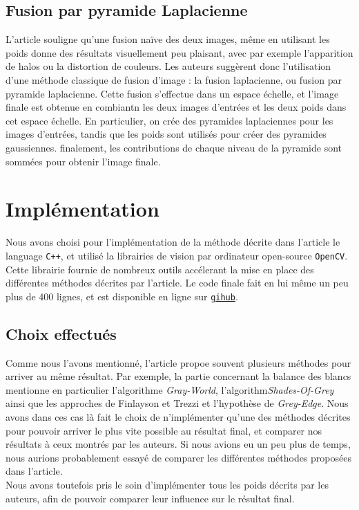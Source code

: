 \documentclass[twoside]{article}
\begin{document}
\subsection{Fusion par pyramide Laplacienne}
L'article souligne qu'une fusion naïve des deux images, même en utilisant les poids donne des résultats visuellement peu plaisant, avec par exemple l'apparition de halos ou la distortion de couleurs. Les auteurs suggèrent donc l'utilisation d'une méthode classique de fusion d'image : la fusion laplacienne, ou fusion par pyramide laplacienne. Cette fusion s'effectue dans un espace échelle, et l'image finale est obtenue en combiantn les deux images d'entrées et les deux poids dans cet espace échelle. En particulier, on crée des pyramides laplaciennes pour les images d'entrées, tandis que les poids sont utilisés pour créer des pyramides gaussiennes. finalement, les contributions de chaque niveau de la pyramide sont sommées pour obtenir l'image finale.

\section{Implémentation}
Nous avons choisi pour l'implémentation de la méthode décrite dans l'article le language \texttt{C++}, et utilisé la librairies de vision par ordinateur open-source \texttt{OpenCV}. Cette librairie fournie de nombreux outils accélerant la mise en place des différentes méthodes décrites par l'article. Le code finale fait en lui même un peu plus de 400 lignes, et est disponible en ligne sur \texttt{\href{http://github.com/jcaille/Submarine}{gihub}}.

\subsection{Choix effectués}
Comme nous l'avons mentionné, l'article propoe souvent plusieurs méthodes pour arriver au même résultat. Par exemple, la partie concernant la balance des blancs mentionne en particulier l'algorithme \emph{Gray-World}, l'algorithm\emph{Shades-Of-Grey} ainsi que les approches de Finlayson et Trezzi et l'hypothèse de \emph{Grey-Edge}. Nous avons dans ces cas là fait le choix de n'implémenter qu'une des méthodes décrites pour pouvoir arriver le plus vite possible au résultat final, et comparer nos résultats à ceux montrés par les auteurs. Si nous avions eu un peu plus de temps, nous aurions probablement essayé de comparer les différentes méthodes proposées dans l'article.\\
Nous avons toutefois pris le soin d'implémenter tous les poids décrits par les auteurs, afin de pouvoir comparer leur influence sur le résultat final.
\end{document}
